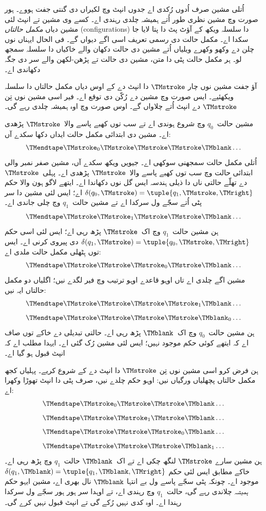 \documentclass[../../../include/open-logic-section]{subfiles}
\begin{document}
\begin{explain}
اُتلی مشین صرف اُدوں
رُکدی اے جدوں انپٹ وچ
لکیراں دی گنتی جفت ہووے۔
ہور صورت وچ مشین نظری طور اُتے
ہمیشہ چلدی رہندی اے۔ کسے وی
مشین تے انپٹ لئی مشین
دیاں \emph{مکمل حالتاں}
(configurations) دا سلسلہ
ویکھ کے آؤٹ پٹ دا پتا
لایا جا سکدا اے۔ مکمل
حالت دی رسمی تعریف
اسی اگے دیواں گے۔
فی الحال ایہناں نوں چلن دے
وکھو وکھرے ویلیاں اُتے مشین دی حالت
دکھان والے خاکیاں دا
سلسلہ سمجھ لو۔ ہر مکمل
حالت پٹی دا متن، مشین
دی حالت تے پڑھن-لکھن
والے سر دی جگہ دکھاندی
اے۔

آؤ جفت مشین نوں چار
$\TMstroke$ دا انپٹ دے
کے اوس دیاں مکمل حالتاں
دا سلسلہ ویکھئیے۔ ایس
صورت وچ مشین دے رُکّن
دی توقع اے۔ فیر اسی
مشین نوں تِن $\TMstroke$
دے انپٹ اُتے چلاواں گے۔
اوس صورت وچ اوہ ہمیشہ چلدی
رہے گی۔

مشین حالت~$q_0$ وچ
شروع ہوندی اے تے
سب توں کھبے پاسے والا~$\TMstroke$
پڑھدی اے۔ مشین دی
ابتدائی مکمل حالت
ایداں دکھا سکدے آں:
\[
\TMendtape \TMstroke_0 \TMstroke \TMstroke \TMstroke \TMblank \ldots
\]
اُتلی مکمل حالت
سمجھنی سوکھی اے۔
جیویں ویکھ سکدے آں،
مشین صفر نمبر والی
ابتدائی حالت وچ
سب توں کھبے پاسے والا~$\TMstroke$
پڑھدی اے۔ پہلی~$\TMstroke$
دے تھلّے حالتی ناں
دا ذیلی ہندسہ ایس
گل نوں دکھاندا اے۔
ایتھے لاگو ہون
والا حکم
$\delta(q_0, \TMstroke) = \tuple{q_1, \TMstroke, \TMright}$
اے؛ ایس لئی مشین دا سر
پٹی اُتے سجّے ول سرکدا اے تے مشین
حالت~$q_1$ وچ
چلی جاندی اے۔
\[
\TMendtape \TMstroke \TMstroke_1 \TMstroke \TMstroke \TMblank \ldots
\]
ہن مشین حالت~$q_1$
وچ اک~$\TMstroke$
پڑھ رہی اے؛ ایس
لئی اسی حکم
$\delta(q_1, \TMstroke) = \tuple{q_0,
  \TMstroke, \TMright}$
دی پیروی کرنی اے۔
ایس توں ہِٹھلی
مکمل حالت ملدی اے:
\[
\TMendtape \TMstroke \TMstroke \TMstroke_0 \TMstroke \TMblank \ldots
\]
مشین اگے چلدی اے
تاں اوہو قاعدے
اوہو ترتیب وچ
فیر لگدے نیں؛
اگلیاں دو مکمل
حالتاں ایہ نیں:
\[
\TMendtape \TMstroke \TMstroke \TMstroke \TMstroke_1 \TMblank \ldots
\]
\[
\TMendtape \TMstroke \TMstroke \TMstroke \TMstroke \TMblank_0 \ldots
\]
ہن مشین حالت~$q_0$
وچ اک~$\TMblank$
پڑھ رہی اے۔
حالتی تبدیلی دے
خاکے توں صاف اے
کہ ایتھے کوئی
حکم موجود نہیں؛
ایس لئی مشین
رُک گئی اے۔
ایہدا مطلب اے
کہ انپٹ قبول
ہو گیا اے۔

ہن فرض کرو اسی
مشین نوں تِن
$\TMstroke$ دا انپٹ
دے کے شروع کریے۔
پہلیاں کجھ مکمل
حالتاں پچھلیاں
ورگیاں نیں: اوہو
حکم چلدے نیں،
صرف پٹی دا انپٹ
تھوڑا وکھرا اے:
\[
\TMendtape \TMstroke_0 \TMstroke \TMstroke \TMblank \ldots
\]
\[
\TMendtape \TMstroke \TMstroke_1 \TMstroke \TMblank \ldots
\]
\[
\TMendtape \TMstroke \TMstroke \TMstroke_0 \TMblank \ldots
\]
\[
\TMendtape \TMstroke \TMstroke \TMstroke \TMblank_1 \ldots
\]
ہن مشین سارے
$\TMstroke$ لنگھ
چکی اے تے
اک~$\TMblank$
حالت~$q_1$ وچ
پڑھ رہی اے۔
خاکے مطابق
ایس لئی حکم
$\delta(q_1, \TMblank) =\tuple{q_1,
\TMblank, \TMright}$
موجود اے۔ چونکہ
پٹی سجّے پاسے
ول بے انتہا
$\TMblank$ نال
بھری اے، مشین
ایہو حکم
\emph{ہمیشہ}
چلاندی رہے گی،
حالت~$q_1$ وچ رہندی اے،
تے اوہدا سر ہور ہور سجّے ول سرکدا رہندا اے۔
اوہ کدی
نہیں رُکے گی
تے انپٹ قبول
نہیں کرے گی۔
\end{explain}
\end{document}
